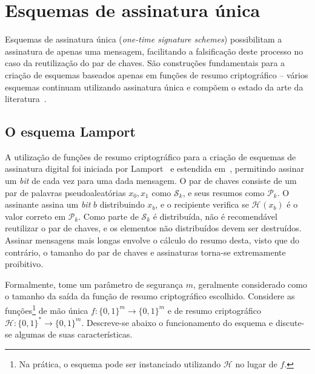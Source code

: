 \documentclass[12pt]{report}
\newcommand{\hh}{\mathcal{H}}
\newcommand{\pk}{\mathcal{P}_k}
\newcommand{\sk}{\mathcal{S}_k}
\newcommand{\hash}[2][]{\mathcal{H}^{#1}(#2)}
\newcommand{\binwds}[1]{\{0, 1\}^{#1}}
\newcommand{\fhash}[1]{\hh{} : \binwds{*} \longrightarrow \binwds{#1}}
\begin{document}
\section{Esquemas de assinatura única}

Esquemas de assinatura única (\emph{one-time signature schemes}) possibilitam a
assinatura de apenas uma mensagem, facilitando a falsificação deste processo no
caso da reutilização do par de chaves. São construções fundamentais para a
criação de esquemas baseados apenas em funções de resumo criptográfico --
vários esquemas continuam utilizando assinatura única e compõem o estado da
arte da literatura~\cite{sphincsplus,irtf-cfrg-xmss-hash-based-signatures-12}.

\subsection{O esquema Lamport}

A utilização de funções de resumo criptográfico para a criação de esquemas de
assinatura digital foi iniciada por Lamport~\cite{lamport1979constructing}
e estendida em~\cite{Diffie:2006:NDC:2263321.2269104, Merkle:1989:CDS:118209.118230},
permitindo assinar um \emph{bit} de cada vez para uma dada mensagem. O par de
chaves consiste de um par de palavras pseudoaleatórias $x_0, x_1$ como $\sk{}$,
e seus resumos como $\pk{}$. O assinante assina um \emph{bit} $b$ distribuindo
$x_b$, e o recipiente verifica se $\hash{x_b}$ é o valor correto em $\pk{}$.
Como parte de $\sk{}$ é distribuída, não é recomendável reutilizar o par de
chaves, e os elementos não distribuídos devem ser destruídos. Assinar mensagens
mais longas envolve o cálculo do resumo desta, visto que do contrário, o
tamanho do par de chaves e assinaturas torna-se extremamente proibitivo.

Formalmente, tome um parâmetro de segurança $m$, geralmente considerado como o
tamanho da saída da função de resumo criptográfico escolhido. Considere as
funções\footnote{Na prática, o esquema pode ser instanciado utilizando $\hh{}$
no lugar de $f$.} de mão única $f : \binwds{m} \longrightarrow \binwds{m}$ e de
resumo criptográfico $\fhash{m}$.  Descreve-se abaixo o funcionamento do
esquema e discute-se algumas de suas características.
\end{document}
